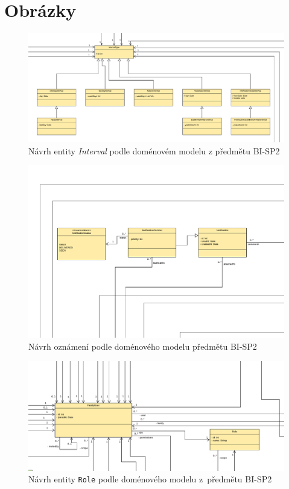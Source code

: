 \chapter{Obrázky}\label{dodatek:images}
    \begin{figure}\centering
        \includegraphics[angle=90, height=1.0\textheight]{pdfs/Interval1}
        \caption[Předešlý návrh entity \texttt{Interval}]{Návrh entity \textit{Interval} podle doménovém modelu z předmětu BI-SP2}\label{image:Interval1}
    \end{figure}
    \begin{figure}\centering
            \includegraphics[angle=90, height=1.0\textheight]{pdfs/Notification1}
            \caption[Předešlý návrh oznámení]{Návrh oznámení podle doménového modelu předmětu BI-SP2}\label{image:notification1}
        \end{figure}
        \begin{figure}\centering
	        \includegraphics[width=1.0\textwidth]{pdfs/Role1}
	        \caption[Návrh \texttt{Role}]{Návrh entity \texttt{Role} podle doménového modelu z~předmětu BI-SP2}\label{image:Role1}
        \end{figure}
